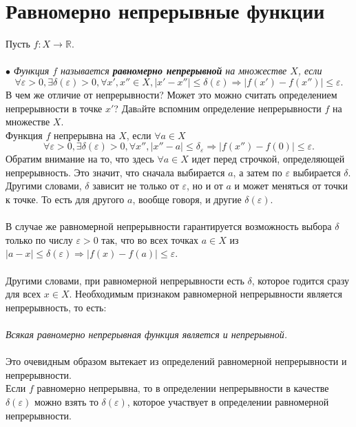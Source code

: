 	\section{Равномерно непрерывные функции}
	Пусть $f : X \rightarrow \mathbb{R}$.\\\\
	$\bullet$ \textit{Функция $f$ называется \textbf{равномерно непрерывной} на множестве $X$, если}
	$$\forall \varepsilon > 0, \exists \delta (\varepsilon) > 0, \forall x', x'' \in X,
	\vert x' - x''\vert  \leqslant \delta(\varepsilon) \Rightarrow 
	\vert f(x') - f(x'')\vert \leqslant \varepsilon.$$
	В чем же отличие от непрерывности? Может это можно считать определением непрерывности в точке $x'$? Давaйте вспомним определение непрерывности $f$ на множестве $X$.\\
	Функция $f$ непрерывна на $X$, если $\forall a \in X$
	$$\forall \varepsilon > 0, \exists \delta (\varepsilon) > 0, \forall x'', \vert x'' - a\vert \leqslant \delta_\varepsilon \Rightarrow \vert f(x'') - f(0)\vert \leqslant \varepsilon.$$
	Обратим внимание на то, что здесь $\forall a \in X$ идет перед строчкой, определяющей непрерывность. Это значит, что сначала выбирается $a$, а затем по $\varepsilon$ выбирается $\delta$. Другими словами, $\delta$ зависит не только от $\varepsilon$, но и от $a$ и может меняться от точки к точке. То есть для другого $a$, вообще говоря, и другие $\delta(\varepsilon)$.\\\\
	В случае же равномерной непрерывности гарантируется возможность выбора $\delta$ только по числу $\varepsilon > 0$ так, что во всех точках $a \in X$ из $\vert a - x\vert \leqslant \delta(\varepsilon) \Rightarrow \vert f(x) - f(a)\vert \leqslant \varepsilon$.\\\\
	Другими словами, при равномерной непрерывности есть $\delta$, которое годится сразу для всех $x \in X$.
	Необходимым признаком равномерной непрерывности является непрерывность, то есть:\\\\
	\textit{Всякая равномерно непрерывная функция является и непрерывной.}\\\\
	Это очевидным образом вытекает из определений равномерной непрерывности и непрерывности.\\
	Если $f$ равномерно непрерывна, то в определении непрерывности в качестве $\delta(\varepsilon)$ можно взять то $\delta(\varepsilon)$, которое участвует в определении равномерной непрерывности.\\
